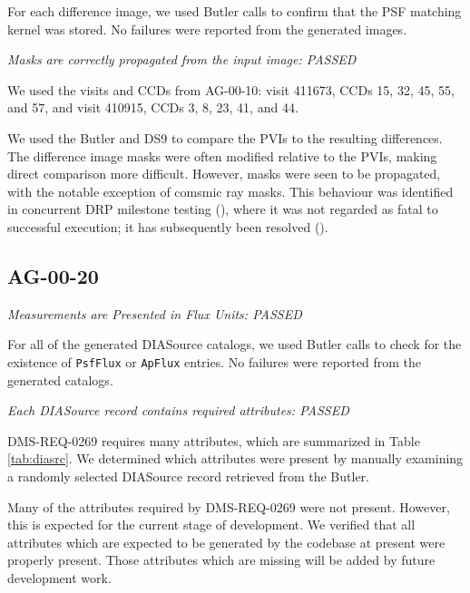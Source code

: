 \documentclass[DM,STR,toc]{lsstdoc}
\begin{document}
For each difference image, we used Butler calls to confirm that the PSF matching kernel was stored.  No failures were reported from the generated images.

\textit{Masks are correctly propagated from the input image: PASSED}

We used the visits and CCDs from AG-00-10:
visit 411673, CCDs 15, 32, 45, 55, and 57, and
visit 410915, CCDs 3,  8, 23, 41, and 44.

We used the Butler and DS9 to compare the PVIs to the resulting differences.
The difference image masks were often modified relative to the PVIs, making
direct comparison more difficult. However, masks were seen to be propagated,
with the notable exception of comsmic ray masks. This behaviour was identified
in concurrent DRP milestone testing (), where it was not
regarded as fatal to successful execution; it has subsequently been resolved
().

\subsection{AG-00-20}
\label{sect:ag-00-20}

\textit{Measurements are Presented in Flux Units: PASSED }

For all of the generated DIASource catalogs, we used Butler calls to check for
the existence of \texttt{PsfFlux} or \texttt{ApFlux} entries.  No failures were
reported from the generated catalogs.

\textit{Each DIASource record contains required attributes: PASSED}

DMS-REQ-0269 requires many attributes, which are summarized in Table
\ref{tab:diasrc}.  We determined which attributes were present by manually
examining a randomly selected DIASource record retrieved from the Butler.

Many of the attributes required by DMS-REQ-0269 were not present. However, this
is expected for the current stage of development. We verified that all
attributes which are expected to be generated by the codebase at present were
properly present. Those attributes which are missing will be added by future
development work.
\end{document}
